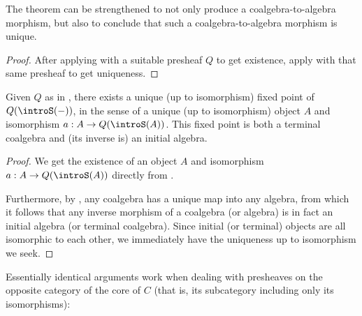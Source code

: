 \begin{theorem}\label{CoalgToAlgUnique}
The theorem  can be strengthened to not only produce a coalgebra-to-algebra morphism, but also to conclude that such a coalgebra-to-algebra morphism is unique.
\end{theorem}
\begin{proof}
After applying  with a suitable presheaf $Q$ to get existence, apply  with that same presheaf to get uniqueness.
\end{proof}

\begin{theorem}
Given $Q$ as in , there exists a unique (up to isomorphism) fixed point of $Q(\introS(-))$, in the sense of a unique (up to isomorphism) object $A$ and isomorphism $a : A \to Q(\introS(A))$. This fixed point is both a terminal coalgebra and (its inverse is) an initial algebra.
\end{theorem}
\begin{proof}
We get the existence of an object $A$ and isomorphism $a : A \to Q(\introS(A))$ directly from .

Furthermore, by , any coalgebra has a unique map into any algebra, from which it follows that any inverse morphism of a coalgebra (or algebra) is in fact an initial algebra (or terminal coalgebra). Since initial (or terminal) objects are all isomorphic to each other, we immediately have the uniqueness up to isomorphism we seek.
\end{proof}

Essentially identical arguments work when dealing with presheaves on the opposite category of the core of $C$ (that is, its subcategory including only its isomorphisms):

